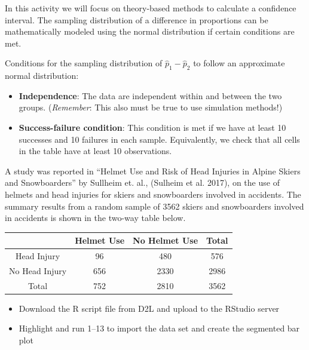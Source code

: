 \documentclass[
]{report}
\begin{document}
In this activity we will focus on theory-based methods to calculate a confidence interval. The sampling distribution of a difference in proportions can be mathematically modeled using the normal distribution if certain conditions are met.

Conditions for the sampling distribution of \(\hat{p}_1-\hat{p}_2\) to follow an approximate normal distribution:

\begin{itemize}
\item
  \textbf{Independence}: The data are independent within and between the two groups. (\emph{Remember}: This also must be true to use simulation methods!)
\item
  \textbf{Success-failure condition}: This condition is met if we have at least 10 successes and 10 failures in each sample. Equivalently, we check that all cells in the table have at least 10 observations.
\end{itemize}

A study was reported in ``Helmet Use and Risk of Head Injuries in Alpine Skiers and Snowboarders'' by Sullheim et. al., (Sulheim et al. 2017), on the use of helmets and head injuries for skiers and snowboarders involved in accidents. The summary results from a random sample of 3562 skiers and snowboarders involved in accidents is shown in the two-way table below.

\begin{longtable}[]{@{}cccc@{}}
\toprule\noalign{}
& Helmet Use & No Helmet Use & Total \\
\midrule\noalign{}
\endhead
\bottomrule\noalign{}
\endlastfoot
Head Injury & 96 & 480 & 576 \\
No Head Injury & 656 & 2330 & 2986 \\
Total & 752 & 2810 & 3562 \\
\end{longtable}

\begin{itemize}
\item
  Download the R script file from D2L and upload to the RStudio server
\item
  Highlight and run 1--13 to import the data set and create the segmented bar plot
\end{itemize}
\end{document}
